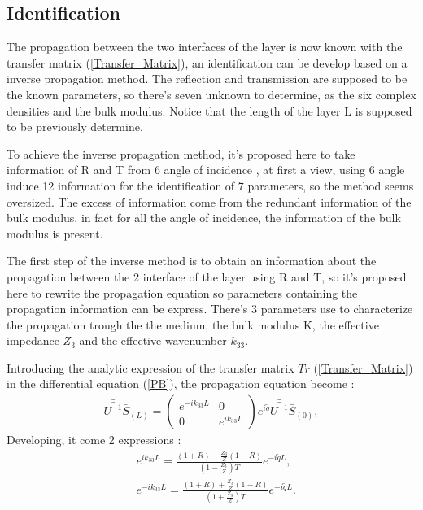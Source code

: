 \documentclass{article}
\begin{document}
\subsection{Identification}
    The propagation between the two interfaces of the layer is now known with the transfer matrix (\ref{Transfer_Matrix}), an identification can be develop based on a inverse propagation method. The reflection and transmission are supposed to be the known parameters, so there's seven unknown to determine, as the six complex densities and the bulk modulus. Notice that the length of the layer L is supposed to be previously determine.
    
    To achieve the inverse propagation method, it's proposed here to take information  of R and T from 6 angle of incidence , at first a view, using 6 angle induce 12 information for the identification of 7 parameters, so the method seems oversized. The excess of information come from the redundant information of the bulk modulus, in fact for all the angle of incidence, the information of the bulk modulus is present. 
    
    The first step of the inverse method is to obtain an information about the propagation between the 2 interface of the layer using R and T, so it's proposed here to rewrite the propagation equation so parameters containing the propagation information can be express. There's 3 parameters use to characterize the propagation trough the the medium, the bulk modulus K, the effective impedance $Z_3$ and the effective wavenumber $k_{33}$.
    
    Introducing the analytic expression of the transfer matrix $Tr$ (\ref{Transfer_Matrix}) in the differential equation (\ref{PB}), the propagation equation become :
    \begin{align}
    \bar{\bar{U^{-1}}} \bar{S}_{(L)}= \begin{pmatrix}
                                   			e^{-ik_{33}L} & 0 \\ 0 & e^{ik_{33}L}
                                            \end{pmatrix}e^{i\tilde{q}} \bar{\bar{U^{-1}}} \bar{S}_{(0)}, 
   \end{align} 
    Developing, it come 2 expressions  :
    \begin{align}
	&e^{i k_{33}L}=\frac{(1+R)-\frac{Z_3}{Z}(1-R)}{(1-\frac{Z_3}{Z})T}e^{-i\tilde{q}L},\label{k_33_tmp1}\\
    &e^{-i k_{33}L}=\frac{(1+R)+\frac{Z_3}{Z}(1-R)}{(1+\frac{Z_3}{Z})T}e^{-i\tilde{q}L}.\label{k_33_tmp2}
    \end{align} 
\end{document}
